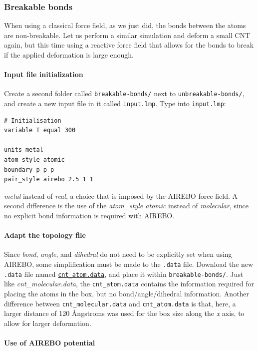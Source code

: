 \documentclass[9pt,tutorial]{livecoms}
\newcommand{\flrcmd}[1]{\textcolor{command}{\texttt{#1}}} %
\newcommand{\flecmd}[1]{\textcolor{command}{\texttt{#1}}} %
\newcommand{\dwlcmd}[1]{\textcolor{download}{\texttt{#1}}} %
\newcommand{\filepath}{https://raw.githubusercontent.com/lammpstutorials/lammpstutorials-article/main/files/}
\begin{document}
\subsubsection{Breakable bonds}

When using a classical force field, as we just did, the bonds between the atoms
are non-breakable. Let us perform a similar simulation and deform a small
CNT again, but this time using a reactive force field that allows for the bonds
to break if the applied deformation is large enough.

\paragraph{Input file initialization}
Create a second folder called \flrcmd{breakable-bonds/} next to
\flrcmd{unbreakable-bonds/}, and create a new input file in it called
\flecmd{input.lmp}. Type into \flecmd{input.lmp}:
\begin{lstlisting}
# Initialisation
variable T equal 300

units metal
atom_style atomic
boundary p p p
pair_style airebo 2.5 1 1
\end{lstlisting}
\textit{metal} instead of \textit{real}, a choice that is imposed by the
AIREBO force field. A second difference is the use of the
\textit{atom\_style atomic} instead of \textit{molecular}, since no explicit
bond information is required with AIREBO.

\paragraph{Adapt the topology file}

Since \textit{bond}, \textit{angle}, and \textit{dihedral} do not need to be
explicitly set when using AIREBO, some simplification must be made to the
\flecmd{.data} file. Download the new \flecmd{.data}
file named \href{\filepath tutorial2/breakable-bonds/cnt_atom.data}{\dwlcmd{cnt\_atom.data}},
and place it within \flrcmd{breakable-bonds/}. Just like \textit{cnt\_molecular.data},
the \flecmd{cnt\_atom.data} contains the information
required for placing the atoms in the box, but no bond/angle/dihedral information.
Another difference between \flecmd{cnt\_molecular.data} and \flecmd{cnt\_atom.data}
is that, here, a larger distance of 120 Ångstroms was used for the box size along
the \textit{x} axis, to allow for larger deformation.

\paragraph{Use of AIREBO potential}
\end{document}
